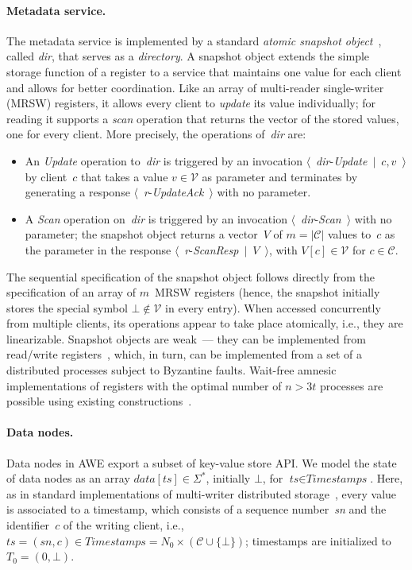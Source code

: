\documentclass[oribibl]{llncs}
\theoremstyle{definition-boldhead}
\newcommand{\var}[1]{\textit{#1}}
\newcommand{\event}[2]{$\langle$~{\var{#1}}-\textsl{#2}~$\rangle$}
\newcommand{\eventt}[3]{$\langle$~{\var{#1}}-\textsl{#2}~$\mid$~{#3}~$\rangle$}
\newcommand{\clientset}{\ensuremath{\mathcal{C}}\xspace}
\newcommand{\values}{\ensuremath{\mathcal{V}}\xspace}
\newcommand{\strings}{\ensuremath{\Sigma^{*}}}
\newcommand{\dir}{\var{dir}\xspace}
\newcommand{\NAME}{AWE\xspace}
\newcommand{\nodes}{nodes\xspace}
\begin{document}
\paragraph{Metadata service.}
The metadata service is implemented by a standard \emph{atomic
  snapshot object}~\cite{aadgms93}, called \dir, that serves as a
\emph{directory}.  A snapshot object extends the simple storage
function of a register to a service that maintains one value for each
client and allows for better coordination.  Like an array of
multi-reader single-writer (MRSW) registers, it allows every client to
\emph{update} its value individually; for reading it supports a
\emph{scan} operation that returns the vector of the stored values,
one for every client.  More precisely, the operations of~\dir are:
\begin{itemize}
\item An \emph{Update} operation to~\dir is triggered by an invocation
  \eventt{dir}{Update}{$c, v$} by client~$c$ that takes a value $v \in
  \values$ as parameter and terminates by generating a response
  \event{r}{UpdateAck} with no parameter.
\item A \emph{Scan} operation on~\dir is triggered by an invocation
  \event{dir}{Scan} with no parameter; the snapshot object returns a
  vector~$V$ of $m = |\clientset|$ values to~$c$ as the parameter in
  the response \eventt{r}{ScanResp}{$V$}, with $V[c] \in \values$ for
  $c \in \clientset$.
\end{itemize}
The sequential specification of the snapshot object follows directly
from the specification of an array of $m$~MRSW registers
(hence, the snapshot initially stores the special symbol $\bot \not\in
\values$ in every entry).  When accessed concurrently from multiple
clients, its operations appear to take place atomically, i.e., they
are linearizable.  Snapshot objects are weak~--- they can be
implemented from read/write registers~\cite{aadgms93}, which, in turn,
can be implemented from a set of a distributed processes subject to
Byzantine faults.  Wait-free amnesic implementations of registers with
the optimal number of $n > 3t$ processes are possible using existing
constructions~\cite{gulevu06,domasu08}.


\if\submit\yes
\paragraph{Data \nodes.}

Data \nodes in \NAME export a subset of key-value store API. We model the state of data nodes as an array $\var{data}[\var{ts}] \in \strings$, initially $\bot$, for $\var{ts} \in \var{Timestamps}$.  Here, as
in standard implementations of multi-writer distributed
storage~\cite{CachinGR11}, every value is associated to a timestamp,
which consists of a sequence number~\var{sn} and the identifier~$c$ of the writing client, i.e., $\var{ts} = (\var{sn}, c) \in
\var{Timestamps} = N_0 \times (\clientset \cup \{\bot\})$; timestamps
are initialized to $T_0 = (0, \bot)$.
\end{document}
